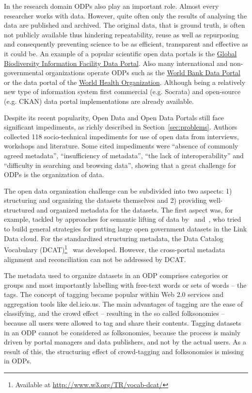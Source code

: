 In the research domain ODPs also play an important role.
Almost every researcher works with data. 
However, quite often only the results of analysing the data are published and archived. 
The original data, that is ground truth, is often not publicly available thus hindering repeatability, reuse as well as repurposing and consequently preventing science to be as efficient, transparent and effective as it could be. 
An example of a popular scientific open data portals is the \href{http://data.gbif.org}{Global Biodiversity Information Facility Data Portal}.
Also many international and non-governmental organizations operate ODPs such as the \href{http://data.worldbank.org}{World Bank Data Portal} or the data portal of the \href{http://apps.who.int/gho/data/}{World Health Organization}.
Although being a relatively new type of information system first commercial (e.g. Socrata) and open-source (e.g. CKAN) data portal implementations are already available.

Despite its recent popularity, Open Data and Open Data Portals still face significant impediments, as richly described in Section~\ref{sec:problems}.
Authors collected 118 socio-technical impediments for use of open data from interviews, workshops and literature.
Some cited impediments were ``absence of commonly agreed metadata'', ``insufficiency of metadata'', ``the lack of interoperability'' and ``difficulty in searching and browsing data'', showing that a great challenge for ODPs is the organization of data.

The open data organization challenge can be subdivided into two aspects: 1) structuring and organizing the datasets themselves and 2) providing well-structured and organized metadata for the datasets.
The first aspect was, for example, tackled by approaches for semantic lifting of data by~\cite{DBLP:conf/i-semantics/ErmilovAS13} and~\cite{Ding2011325}, who tried to build general strategies for putting large open government datasets in the Link Data cloud.
For the standardized structuring metadata, the Data Catalog Vocabulary (DCAT)\footnote{Available at \url{http://www.w3.org/TR/vocab-dcat/}}~\cite{conf/i-semantics/CyganiakMP10} was developed.
However, the cross-portal metadata alignment and reconciliation can not be addressed by DCAT.

The metadata used to organize datasets in an ODP comprises categories or groups and most importantly labelling with free-text words or sets of words -- the tags.
The concept of tagging became popular within Web 2.0 services and aggregation tools like del.icio.us. 
The main advantages of tagging are the ease of classifying, and the crowd effect -- resulting in the so called folksonomies -- because all users were allowed to tag and share their contents. 
Tagging datasets in an ODP cannot be considered as folksonomies, because the process is mainly driven by portal managers and data publishers, and not by the actual users.
As a result of this, the structuring effect of crowd-tagging and folksonomies is missing in ODPs.

